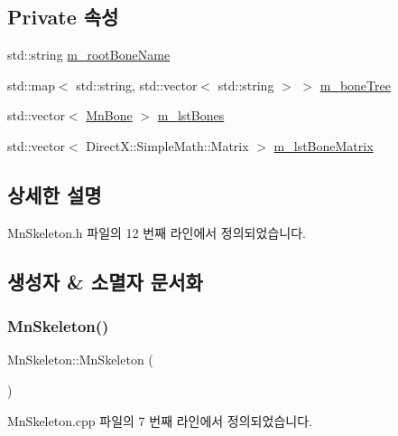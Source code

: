 \subsection*{Private 속성}
\begin{DoxyCompactItemize}
\item 
std\+::string \hyperlink{class_m_n_l_1_1_mn_skeleton_a06064d27da5eb5ce0074f9f08abd54f6}{m\+\_\+root\+Bone\+Name}
\item 
std\+::map$<$ std\+::string, std\+::vector$<$ std\+::string $>$ $>$ \hyperlink{class_m_n_l_1_1_mn_skeleton_a18c08256f1a9ba2ade021bee10b1b960}{m\+\_\+bone\+Tree}
\item 
std\+::vector$<$ \hyperlink{class_m_n_l_1_1_mn_bone}{Mn\+Bone} $>$ \hyperlink{class_m_n_l_1_1_mn_skeleton_a80c3e9789e584313e6fbae03f4184a12}{m\+\_\+lst\+Bones}
\item 
std\+::vector$<$ Direct\+X\+::\+Simple\+Math\+::\+Matrix $>$ \hyperlink{class_m_n_l_1_1_mn_skeleton_aff568cb8840e6f4c5d72ab9b639a665d}{m\+\_\+lst\+Bone\+Matrix}
\end{DoxyCompactItemize}


\subsection{상세한 설명}


Mn\+Skeleton.\+h 파일의 12 번째 라인에서 정의되었습니다.



\subsection{생성자 \& 소멸자 문서화}
\mbox{\label{class_m_n_l_1_1_mn_skeleton_adf1be48a501ebca36f4994a3c50c8084}} 
\subsubsection{\texorpdfstring{Mn\+Skeleton()}{MnSkeleton()}}
{\footnotesize\ttfamily Mn\+Skeleton\+::\+Mn\+Skeleton (\begin{DoxyParamCaption}{ }\end{DoxyParamCaption})}



Mn\+Skeleton.\+cpp 파일의 7 번째 라인에서 정의되었습니다.

